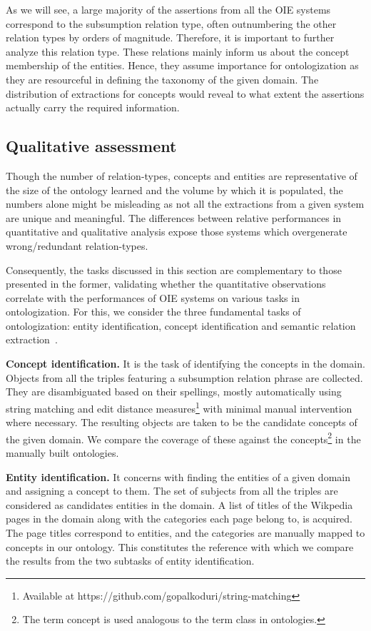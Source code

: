 \documentclass{llncs}
\begin{document}
As we will see, a large majority of the assertions from all the OIE systems correspond to the subsumption relation type, often outnumbering the other relation types by orders of magnitude. Therefore, it is important to further analyze this relation type. These relations mainly inform us about the concept membership of the entities. Hence, they assume importance for ontologization as they are resourceful in defining the taxonomy of the given domain. The distribution of extractions for concepts would reveal to what extent the assertions actually carry the required information.

\subsection{Qualitative assessment}
Though the number of relation-types, concepts and entities are representative of the size of the ontology learned and the volume by which it is populated, the numbers alone might be misleading as not all the extractions from a given system are unique and meaningful. The differences between relative performances in quantitative and qualitative analysis expose those systems which overgenerate wrong/redundant relation-types.

Consequently, the tasks discussed in this section are complementary to those presented in the former, validating whether the quantitative observations correlate with the performances of OIE systems on various tasks in ontologization. For this, we consider the three fundamental tasks of ontologization: entity identification, concept identification and semantic relation extraction~\cite{Petasis2011}.

\medskip
\noindent
\textbf{Concept identification.} It is the task of identifying the concepts in the domain. Objects from all the triples featuring a subsumption relation phrase are collected. They are disambiguated based on their spellings, mostly automatically using string matching and edit distance measures\footnote{Available at https://github.com/gopalkoduri/string-matching} with minimal manual intervention where necessary. The resulting objects are taken to be the candidate concepts of the given domain. We compare the coverage of these against the concepts\footnote{The term concept is used analogous to the term class in ontologies.} in the manually built ontologies.

\medskip
\noindent
\textbf{Entity identification.} It concerns with finding the entities of a given domain and assigning a concept to them. The set of subjects from all the triples are considered as candidates entities in the domain. A list of titles of the Wikpedia pages in the domain along with the categories each page belong to, is acquired. The page titles correspond to entities, and the categories are manually mapped to concepts in our ontology. This constitutes the reference with which we compare the results from the two subtasks of entity identification.
\end{document}
